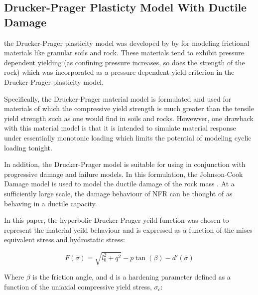 \subsection{Drucker-Prager Plasticty Model With Ductile Damage}

the Drucker-Prager plasticity model was developed by by \citet{drucker_implications_1950} for modeling frictional materials like granular soils and rock. These materials tend  to exhibit pressure dependent yielding (as confining
pressure increases, so does the strength of the rock) which was incorporated as a pressure dependent yield criterion in the Drucker-Prager plasticity model. 

Specifically, the Drucker-Prager material model is formulated and used for materials of which the compressive yield strength is much greater than the tensile yield strength such as one would find in soils and rocks. Howewver, one drawback with this material model is that it is intended to simulate material response under essentially monotonic loading which limits the potential of modeling cyclic loading tonight.

In addition, the Drucker-Prager model is suitable for using in conjunction with progressive damage and failure models. In this formulation, the Johnson-Cook Damage model is used to model the ductile damage of the rock mass \cite{johnson_fracture_1985}. At a sufficiently large scale, the damage behaviour of NFR can be thought of as behaving in a ductile capacity. 




In this paper, the hyperbolic Drucker-Prager yeild function was chosen to represent the material yeild behaviour and is expressed as a function of the mises equivalent stress and hydrostatic stress:

\begin{equation}
F\left(\bar{\sigma}\right)=\sqrt{l_{0}^{2}+q^{2}}-p\tan\left(\beta\right)-d'\left(\bar{\sigma}\right)\label{eqn:druc2}
\end{equation}

Where $\beta$ is the friction angle, and d is a hardening parameter defined as a function of the uniaxial compressive yield stress, $\sigma_c$:

